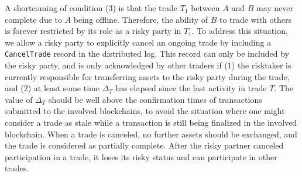 A shortcoming of condition (3) is that the trade $ T_1 $ between $ A $ and $ B $ may never complete due to $ A $ being offline.
Therefore, the ability of $ B $ to trade with others is forever restricted by its role as a risky party in $ T_1 $.
To address this situation, we allow a risky party to explicitly cancel an ongoing trade by including a \texttt{CancelTrade} record in the distributed log.
This record can only be included by the risky party, and is only acknowledged by other traders if (1) the risktaker is currently responsible for transferring assets to the risky party during the trade, and (2) at least some time $ \Delta_T $ has elapsed since the last activity in trade $ T $.
The value of $ \Delta_T $ should be well above the confirmation times of transactions submitted to the involved blockchains, to avoid the situation where one might consider a trade as stale while a transaction is still being finalized in the involved blockchain.
When a trade is canceled, no further assets should be exchanged, and the trade is considered as partially complete.
After the risky partner canceled participation in a trade, it loses its risky status and can participate in other trades.

